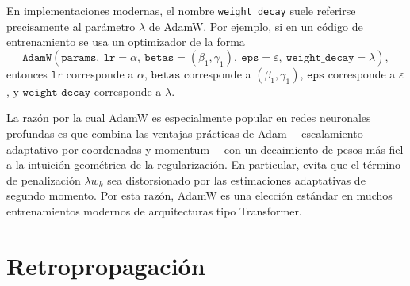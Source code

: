 \documentclass[11pt]{report}
\theoremstyle{definition}
\theoremstyle{plain}
\numberwithin{equation}{section}
\begin{document}
En implementaciones modernas, el nombre \texttt{weight\_decay} suele referirse precisamente al parámetro \(\lambda\) de AdamW. Por ejemplo, si en un código de entrenamiento se usa un optimizador de la forma
\begin{equation*}
    \texttt{AdamW}(\texttt{params},\ \texttt{lr}=\alpha,\ \texttt{betas}=(\beta_1,\gamma_1),\ \texttt{eps}=\varepsilon,\ \texttt{weight\_decay}=\lambda),
\end{equation*}
entonces \(\texttt{lr}\) corresponde a \(\alpha\), \(\texttt{betas}\) corresponde a \((\beta_1,\gamma_1)\), \(\texttt{eps}\) corresponde a \(\varepsilon\), y \(\texttt{weight\_decay}\) corresponde a \(\lambda\).

La razón por la cual AdamW es especialmente popular en redes neuronales profundas es que combina las ventajas prácticas de Adam —escalamiento adaptativo por coordenadas y momentum— con un decaimiento de pesos más fiel a la intuición geométrica de la regularización. En particular, evita que el término de penalización \(\lambda w_k\) sea distorsionado por las estimaciones adaptativas de segundo momento. Por esta razón, AdamW es una elección estándar en muchos entrenamientos modernos de arquitecturas tipo Transformer.

\section{Retropropagación}
\end{document}
